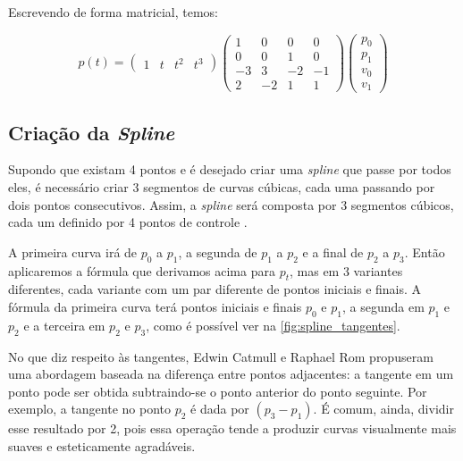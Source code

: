 Escrevendo de forma matricial, temos:

\begin{equation}
    p(t) =  
        \left(
        \begin{array}{rrrr}
            1 & t & t^2 & t^3
        \end{array}\right)
        \left(
        \begin{array}{rrrr}
            1 & 0 & 0 & 0 \\
            0 & 0 & 1 & 0 \\
            -3 & 3 & -2 & -1 \\
                2 & -2 & 1 & 1
        \end{array}\right)
    \left(
        \begin{array}{r}
            p_0 \\
            p_1 \\
            v_0 \\
                v_1
        \end{array}\right)
 \end{equation}

 \subsection{Criação da \textit{Spline}}

 Supondo que existam 4 pontos e é desejado criar uma \textit{spline} que passe por todos eles, é necessário criar 3 segmentos de curvas cúbicas, cada uma passando por dois pontos consecutivos. Assim, a \textit{spline} será composta por 3 segmentos cúbicos, cada um definido por 4 pontos de controle \cite{CatmullRom}.

 A primeira curva irá de $p_0$ a $p_1$, a segunda de $p_1$ a $p_2$ e a final de $p_2$ a $p_3$. Então aplicaremos a fórmula que derivamos acima para $p_t$, mas em 3 variantes diferentes, cada variante com um par diferente de pontos iniciais e finais. A fórmula da primeira curva terá pontos iniciais e finais $p_0$ e $p_1$, a segunda em $p_1$ e $p_2$ e a terceira em $p_2$ e $p_3$, como é possível ver na \autoref{fig:spline_tangentes}. 
 
 No que diz respeito às tangentes, Edwin Catmull e Raphael Rom propuseram uma abordagem baseada na diferença entre pontos adjacentes: a tangente em um ponto pode ser obtida subtraindo-se o ponto anterior do ponto seguinte. Por exemplo, a tangente no ponto $p_2$ é dada por $(p_3 - p_1)$. É comum, ainda, dividir esse resultado por 2, pois essa operação tende a produzir curvas visualmente mais suaves e esteticamente agradáveis.


